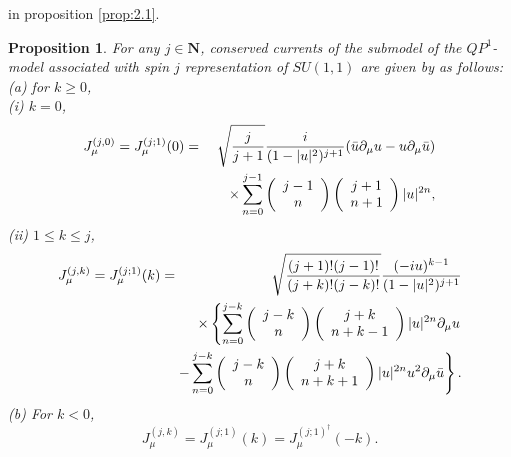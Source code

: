 \documentclass[makeidx,12pt,openany]{report}
\newtheorem{prop}[df]{Proposition}
\begin{document}
in proposition \ref{prop:2.1}. 
\begin{prop}\label{prop:QP1}
For any $j \in \mathbf{N}$, conserved currents of the submodel of 
the $QP^1$-model associated with spin $j$ 
representation of $SU(1,1)$ are given by as follows: \\
(a) for $k \geq 0$, \\
(i) $k=0$,
 \begin{eqnarray}
   J_{\mu}^{(j,0)}=
   J_{\mu}^{(j;1)}(0) &=&
    \sqrt{\frac{j}{j+1}}
    \frac{i}{(1-|u|^2)^{j+1}} 
    (\bar{u} \partial_{\mu} u - u \partial_{\mu} \bar{u})
    \nonumber\\
  && \hspace{4mm} \times
    \sum_{n=0}^{j-1} 
    \left(
     \begin{array}{c}
      j-1 \\
       n  
     \end{array}
    \right)
    \left(
     \begin{array}{c}
       j+1 \\
       n+1  
     \end{array}
    \right) |u|^{2n} ,
  \label{eqn:j39} 
 \end{eqnarray}
(ii) $1 \leq k \leq j$,
 \begin{eqnarray}
   J_{\mu}^{(j,k)}=
   J_{\mu}^{(j;1)}(k) &=&
    \sqrt{\frac{(j+1)!(j-1)!}{(j+k)!(j-k)!}}
    \frac{(-iu)^{k-1}}{(1-|u|^2)^{j+1}} \nonumber\\
  && \hspace{-6mm} \times
   \left\{  
    \sum_{n=0}^{j-k} 
    \left(
     \begin{array}{c}
      j-k \\
       n  
     \end{array}
    \right)
    \left(
     \begin{array}{c}
       j+k \\
       n+k-1  
     \end{array}
    \right)
    |u|^{2n} \partial_{\mu} u 
   \right. \nonumber\\
  && \hspace{-3mm}
   \left.
   -\sum_{n=0}^{j-k} 
    \left(
     \begin{array}{c}
      j-k \\
       n  
     \end{array}
    \right)
    \left(
     \begin{array}{c}
       j+k \\
       n+k+1  
     \end{array}
    \right)
    |u|^{2n} u^2 \partial_{\mu}\bar{u}
   \right\} .
  \label{eqn:j40} 
 \end{eqnarray}
(b) For $k < 0$,
\begin{equation}
  J_{\mu}^{(j,k)}=
  J_{\mu}^{(j;1)}(k)=J_{\mu}^{(j;1)^{\dag}}(-k). 
 \label{eqn:j41}
\end{equation}
\end{prop}
\end{document}
